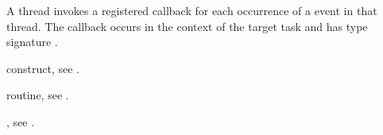 \tools
A thread invokes a registered 
callback for each occurrence of a  
event in that thread. The callback occurs in the context of the 
target task and has type signature .

\begin{crossrefs}
\item {} construct, see
.

\item {} routine, see
.

\item {}, see
.
\end{crossrefs}

